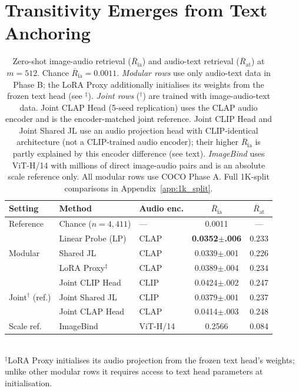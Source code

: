 \documentclass{article}
\newcommand{\avgR}{\overline{R}}
\begin{document}
\section{Transitivity Emerges from Text Anchoring}
\label{sec:transitivity}

\begin{table}[tbp]
  \caption{Zero-shot image-audio retrieval ($\avgR_\mathrm{ia}$) and audio-text retrieval
  ($\avgR_\mathrm{at}$) at $m=512$. Chance $\avgR_\mathrm{ia}=0.0011$.
  \emph{Modular rows} use only audio-text data in Phase B; the LoRA Proxy additionally
  initialises its weights from the frozen text head (see $^\ddagger$).
  \emph{Joint rows} ($^\dag$) are trained with image-audio-text data.
  Joint CLAP Head (5-seed replication) uses the CLAP audio encoder and is the encoder-matched joint reference.
  Joint CLIP Head and Joint Shared JL use an audio projection head with CLIP-identical architecture
  (not a CLIP-trained audio encoder); their higher $\avgR_\mathrm{ia}$ is partly explained by this encoder difference (see text).
  \emph{ImageBind} uses ViT-H/14 with millions of direct image-audio pairs and is an
  absolute scale reference only.
  All modular rows use COCO Phase A.
  Full 1K-split comparisons in Appendix~\ref{app:1k_split}.}
  \label{tab:main}
  \centering
  \footnotesize
  \begin{tabular}{lllcc}
    \toprule
    Setting & Method & Audio enc. & $\avgR_\mathrm{ia}$ & $\avgR_\mathrm{at}$ \\
    \midrule
    Reference & Chance ($n=4{,}411$) & --- & 0.0011 & --- \\
    \midrule
    \multirow{3}{*}{Modular} & Linear Probe (LP) & CLAP & \bf{0.0352}$\pm$.006 & 0.233 \\
                              & Shared JL         & CLAP & 0.0339$\pm$.001 & 0.226 \\
                              & LoRA Proxy$^\ddagger$ & CLAP & 0.0389$\pm$.004 & 0.234 \\
    \midrule
    \multirow{3}{*}{Joint$^\dag$ (ref.)}
                              & Joint CLIP Head   & CLIP & 0.0424$\pm$.002 & 0.247 \\
                              & Joint Shared JL   & CLIP & 0.0379$\pm$.001 & 0.237 \\
                              & Joint CLAP Head       & CLAP & 0.0414$\pm$.003 & 0.248 \\
    \midrule
    Scale ref. & ImageBind \citep{girdhar2023imagebind} & ViT-H/14 & 0.2566 & 0.084 \\
    \bottomrule
  \end{tabular}
  \smallskip\\
  \footnotesize$^\ddagger$LoRA Proxy initialises its audio projection from the frozen text head's weights; unlike other modular rows it requires access to text head parameters at initialisation.
\end{table}
\end{document}
